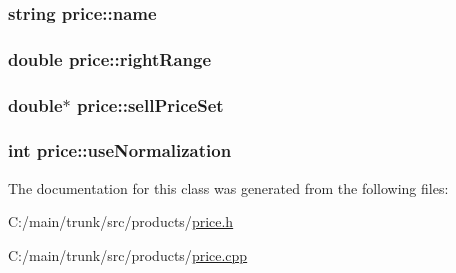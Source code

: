\label{classprice_a11c455e9b6de902a4783857a77023ff9}
\hypertarget{classprice_a210d75a2f9bbb32dcefabf169aadea87}{
\subsubsection[{name}]{\setlength{\rightskip}{0pt plus 5cm}string {\bf price::name}}}
\label{classprice_a210d75a2f9bbb32dcefabf169aadea87}
\hypertarget{classprice_a63c86ef8691125451415316a12ab27d6}{
\subsubsection[{rightRange}]{\setlength{\rightskip}{0pt plus 5cm}double {\bf price::rightRange}}}
\label{classprice_a63c86ef8691125451415316a12ab27d6}
\hypertarget{classprice_a11a4ea5a1276f0b76a5de77996a08c57}{
\subsubsection[{sellPriceSet}]{\setlength{\rightskip}{0pt plus 5cm}double$\ast$ {\bf price::sellPriceSet}}}
\label{classprice_a11a4ea5a1276f0b76a5de77996a08c57}
\hypertarget{classprice_a9ad87ecbc5d76b3ceaa1e664cca3f6ab}{
\subsubsection[{useNormalization}]{\setlength{\rightskip}{0pt plus 5cm}int {\bf price::useNormalization}}}
\label{classprice_a9ad87ecbc5d76b3ceaa1e664cca3f6ab}


The documentation for this class was generated from the following files:\begin{DoxyCompactItemize}
\item 
C:/main/trunk/src/products/\hyperlink{price_8h}{price.h}\item 
C:/main/trunk/src/products/\hyperlink{price_8cpp}{price.cpp}\end{DoxyCompactItemize}
